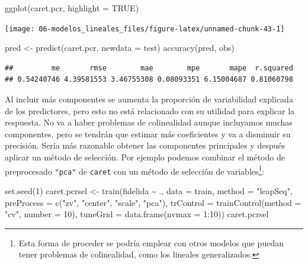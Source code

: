 \documentclass[
  spanish,
]{book}
\newenvironment{Shaded}{\begin{snugshade}}{\end{snugshade}}
\newcommand{\AttributeTok}[1]{\textcolor[rgb]{0.77,0.63,0.00}{#1}}
\newcommand{\ConstantTok}[1]{\textcolor[rgb]{0.00,0.00,0.00}{#1}}
\newcommand{\DecValTok}[1]{\textcolor[rgb]{0.00,0.00,0.81}{#1}}
\newcommand{\FunctionTok}[1]{\textcolor[rgb]{0.00,0.00,0.00}{#1}}
\newcommand{\NormalTok}[1]{#1}
\newcommand{\OtherTok}[1]{\textcolor[rgb]{0.56,0.35,0.01}{#1}}
\newcommand{\SpecialCharTok}[1]{\textcolor[rgb]{0.00,0.00,0.00}{#1}}
\newcommand{\StringTok}[1]{\textcolor[rgb]{0.31,0.60,0.02}{#1}}
\theoremstyle{break}
\theoremstyle{definition}
\theoremstyle{definition}
\theoremstyle{definition}
\theoremstyle{definition}
\theoremstyle{remark}
\begin{document}
\begin{Shaded}
\begin{Highlighting}[]
\FunctionTok{ggplot}\NormalTok{(caret.pcr, }\AttributeTok{highlight =} \ConstantTok{TRUE}\NormalTok{)}
\end{Highlighting}
\end{Shaded}

\begin{center}\texttt{[image: 06-modelos\_lineales\_files/figure-latex/unnamed-chunk-43-1]} \end{center}

\begin{Shaded}
\begin{Highlighting}[]
\NormalTok{pred }\OtherTok{\textless{}{-}} \FunctionTok{predict}\NormalTok{(caret.pcr, }\AttributeTok{newdata =}\NormalTok{ test)}
\FunctionTok{accuracy}\NormalTok{(pred, obs)}
\end{Highlighting}
\end{Shaded}

\begin{verbatim}
##         me       rmse        mae        mpe       mape  r.squared 
## 0.54240746 4.39581553 3.46755308 0.08093351 6.15004687 0.81060798
\end{verbatim}

Al incluir más componentes se aumenta la proporción de variabilidad explicada de los predictores,
pero esto no está relacionado con su utilidad para explicar la respuesta.
No va a haber problemas de colinealidad aunque incluyamos muchas componentes, pero se tendrán que estimar más coeficientes y va a disminuir su precisión.
Sería más razonable obtener las componentes principales y después aplicar un método de selección.
Por ejemplo podemos combinar el método de preprocesado \texttt{"pca"} de \texttt{caret} con un método de selección de variables\footnote{Esta forma de proceder se podría emplear con otros modelos que puedan tener problemas de colinealidad, como los lineales generalizados.}:

\begin{Shaded}
\begin{Highlighting}[]
\FunctionTok{set.seed}\NormalTok{(}\DecValTok{1}\NormalTok{)}
\NormalTok{caret.pcrsel }\OtherTok{\textless{}{-}} \FunctionTok{train}\NormalTok{(fidelida }\SpecialCharTok{\textasciitilde{}}\NormalTok{ ., }\AttributeTok{data =}\NormalTok{ train, }\AttributeTok{method =} \StringTok{"leapSeq"}\NormalTok{,}
                   \AttributeTok{preProcess =} \FunctionTok{c}\NormalTok{(}\StringTok{"zv"}\NormalTok{, }\StringTok{"center"}\NormalTok{, }\StringTok{"scale"}\NormalTok{, }\StringTok{"pca"}\NormalTok{),     }
                   \AttributeTok{trControl =} \FunctionTok{trainControl}\NormalTok{(}\AttributeTok{method =} \StringTok{"cv"}\NormalTok{, }\AttributeTok{number =} \DecValTok{10}\NormalTok{),}
                   \AttributeTok{tuneGrid =} \FunctionTok{data.frame}\NormalTok{(}\AttributeTok{nvmax =} \DecValTok{1}\SpecialCharTok{:}\DecValTok{10}\NormalTok{))}
\NormalTok{caret.pcrsel}
\end{Highlighting}
\end{Shaded}
\end{document}
